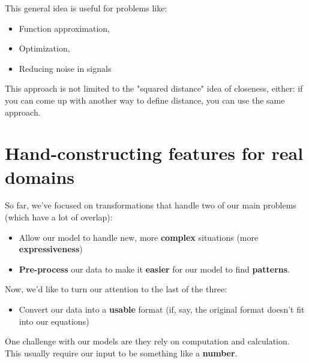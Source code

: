             This general idea is useful for problems like:
            \begin{itemize}
                \item Function approximation,
                \item Optimization,
                \item Reducing noise in signals
            \end{itemize}

            This approach is not limited to the "squared distance" idea of closeness, either: if you can come up with another way to define distance, you can use the same approach.

            
    \secdiv
    


            
    \pagebreak
    \section{Hand-constructing features for real domains }

        So far, we've focused on transformations that handle two of our main problems (which have a lot of overlap):

        \begin{itemize}
                \item Allow our model to handle new, more \textbf{complex} situations (more \textbf{expressiveness})

                \item \textbf{Pre-process} our data to make it \textbf{easier} for our model to find \textbf{patterns}.
                
            \end{itemize}

        Now, we'd like to turn our attention to the last of the three:

        \begin{itemize}
            \item Convert our data into a \textbf{usable} format (if, say, the original format doesn't fit into our equations)
        \end{itemize}

        One challenge with our models are they rely on computation and calculation. This usually require our input to be something like a \textbf{number}.

